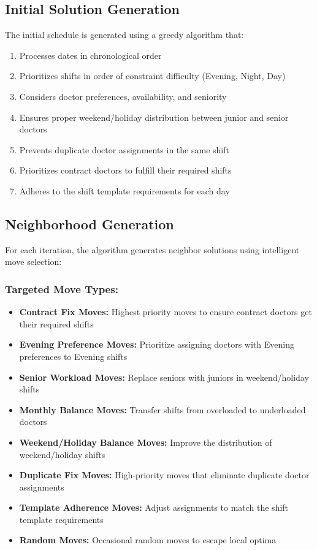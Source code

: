 \documentclass[12pt]{article}
\begin{document}
\subsection{Initial Solution Generation}

The initial schedule is generated using a greedy algorithm that:
\begin{enumerate}
    \item Processes dates in chronological order
    \item Prioritizes shifts in order of constraint difficulty (Evening, Night, Day)
    \item Considers doctor preferences, availability, and seniority
    \item Ensures proper weekend/holiday distribution between junior and senior doctors
    \item Prevents duplicate doctor assignments in the same shift
    \item Prioritizes contract doctors to fulfill their required shifts
    \item Adheres to the shift template requirements for each day
\end{enumerate}

\subsection{Neighborhood Generation}

For each iteration, the algorithm generates neighbor solutions using intelligent move selection:

\subsubsection{Targeted Move Types:}
\begin{itemize}
    \item \textbf{Contract Fix Moves:} Highest priority moves to ensure contract doctors get their required shifts
    \item \textbf{Evening Preference Moves:} Prioritize assigning doctors with Evening preferences to Evening shifts
    \item \textbf{Senior Workload Moves:} Replace seniors with juniors in weekend/holiday shifts
    \item \textbf{Monthly Balance Moves:} Transfer shifts from overloaded to underloaded doctors
    \item \textbf{Weekend/Holiday Balance Moves:} Improve the distribution of weekend/holiday shifts
    \item \textbf{Duplicate Fix Moves:} High-priority moves that eliminate duplicate doctor assignments
    \item \textbf{Template Adherence Moves:} Adjust assignments to match the shift template requirements
    \item \textbf{Random Moves:} Occasional random moves to escape local optima
\end{itemize}
\end{document}
